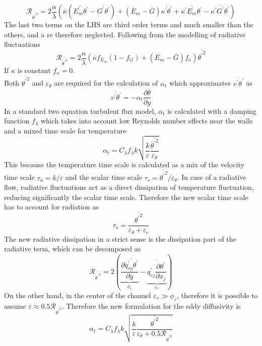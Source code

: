 \documentclass[10pt]{article}
\def\lp{\left(}
\def\rp{\right)}
\def\tp{\overline{{\theta^\prime}^2}}
\def\tm{\overline{\theta}}
\def\tr{{\theta^\prime}}
\def\et{{\varepsilon_{\theta}}}
\begin{document}
\begin{equation*}
\mathcal{R}_{\tp} = 2\frac{\alpha}{\lambda} \lp \overline{\kappa} (\overline{E_m^\prime \tr}-\overline{G^\prime \tr}) + (\overline{E}_m - \overline{G})\overline{\kappa^\prime \tr} + \overline{\kappa^\prime E_m^\prime \tr} - \overline{\kappa^\prime G^\prime \tr} \rp
\end{equation*}
The last two terms on the LHS are third order terms and much smaller than the others, and a re therefore neglected. Following from the modelling of radiative fluctuations
\begin{equation*}
\mathcal{R}_{\tp} = 2\frac{\alpha}{\lambda} \lp \overline{\kappa} f_{E_m}(1 - f_G ) + (\overline{E}_m - \overline{G})f_{\kappa} \rp \tp
\end{equation*}
If $\kappa$ is constant $f_{\kappa} = 0$.\\

\noindent Both $\tp$ and $\et$ are required for the calculation of $\alpha_t$ which approximates $\overline{v^\prime \tr}$ as
\begin{equation*}
\overline{v^\prime \tr} = - \alpha_t \frac{\partial \tm}{\partial y}
\end{equation*}
In a standard two equation turbulent flux model, $\alpha_t$ is calculated with a damping function $f_{\lambda}$ which takes into account low Reynolds number effects near the walls and a mixed time scale for temperature
\begin{equation*}
\alpha_t = C_{\lambda} f_{\lambda} k \sqrt{\frac{k}{\varepsilon}\frac{\tp}{\et}}
\end{equation*} 
This because the temperature time scale is calculated as a mix of the velocity time scale $\tau_u= k/\varepsilon$ and the scalar time scale $\tau_s = \tp/\et$. In case of a radiative flow, radiative fluctuations act as a direct dissipation of temperature fluctuation, reducing significantly the scalar time scale. Therefore the new scalar time scale has to account for radiation as
\begin{equation*}
\tau_s = \frac{\tp}{\et + \varepsilon_r}
\end{equation*}
The new radiative dissipation in a strict sense is the dissipation part of the radiative term, which can be decomposed as
\begin{equation*}
\mathcal{R}_{\tp} = 2 \lp \underbrace{\frac{\partial \overline{q_{ry}^\prime \tr}}{\partial y}}_{\phi_r} - \underbrace{\overline{q_{rj}^\prime\frac{\partial \tr}{\partial x_j}}}_{\varepsilon_r} \rp
\end{equation*}
On the other hand, in the center of the channel $\varepsilon_r \gg \phi_r$, therefore it is possible to assume $\varepsilon \approx 0.5 \mathcal{R}_{\tp}$.
Therefore the new formulation for the eddy diffusivity is
\begin{equation*}
\alpha_t = C_{\lambda} f_{\lambda} k \sqrt{\frac{k}{\varepsilon}\frac{\tp}{\et+0.5\mathcal{R}_{\tp}}}
\end{equation*}
\newpage 
\end{document}
